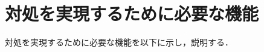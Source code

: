 \documentclass[tanilab-enum]{graduate}
\begin{document}
\section{対処を実現するために必要な機能}
対処を実現するために必要な機能を以下に示し，説明する．
\end{document}
